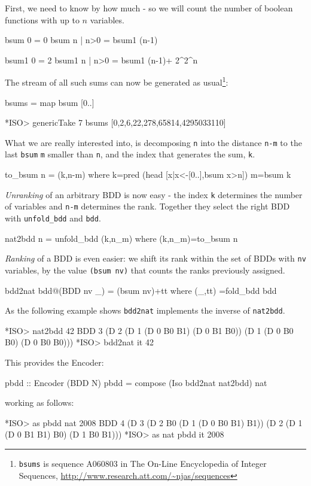 \documentclass[]{INCLUDES/llncs}
\begin{document}
First, we need to know by how much - so we will count the number
of boolean functions with up to $n$ variables.
\begin{code}
bsum 0 = 0
bsum n | n>0 = bsum1 (n-1)

bsum1 0 = 2
bsum1 n | n>0 = bsum1 (n-1)+ 2^2^n
\end{code}
The stream of all such sums can now be generated as usual\footnote{{\tt bsums}
is sequence A060803 in The On-Line Encyclopedia of Integer
Sequences, \url{http://www.research.att.com/~njas/sequences}}:
\begin{code}
bsums = map bsum [0..]
\end{code}
\begin{codex}
*ISO> genericTake 7 bsums
  [0,2,6,22,278,65814,4295033110]
\end{codex}

What we are really interested into, is decomposing {\tt n} into
the distance {\tt n-m} to the
last {\tt bsum} {\tt m} smaller than {\tt n},
and the index that generates the sum, {\tt k}.
\begin{code}
to_bsum n = (k,n-m) where 
  k=pred (head [x|x<-[0..],bsum x>n])
  m=bsum k
\end{code}
{\em Unranking} of an arbitrary BDD is now easy - the index {\tt k}
determines the number of variables and {\tt n-m} determines
the rank. Together they select the right BDD
with {\tt unfold\_bdd} and {\tt bdd}.
\begin{code}
nat2bdd n = unfold_bdd (k,n_m) where (k,n_m)=to_bsum n
\end{code}
{\em Ranking} of a BDD is even easier: we shift its rank
within the set of BDDs with {\tt nv} 
variables, by the value {\tt (bsum nv)} that
counts the ranks previously assigned.
\begin{code}
bdd2nat bdd@(BDD nv _) = (bsum nv)+tt where
  (_,tt) =fold_bdd bdd
\end{code}
As the following example shows
{\tt bdd2nat}
implements the inverse of
{\tt nat2bdd}.
\begin{codex}
*ISO> nat2bdd 42
BDD 3 (D 2 (D 1 (D 0 B0 B1) (D 0 B1 B0)) 
           (D 1 (D 0 B0 B0) (D 0 B0 B0)))
*ISO> bdd2nat it
42
\end{codex}

This provides the Encoder:
\begin{code}
pbdd :: Encoder (BDD N)
pbdd = compose (Iso bdd2nat nat2bdd) nat
\end{code}
working as follows:
\begin{codex}
*ISO> as pbdd nat 2008
BDD 4 (D 3 (D 2 B0 (D 1 (D 0 B0 B1) B1)) 
      (D 2 (D 1 (D 0 B1 B1) B0) (D 1 B0 B1)))
*ISO> as nat pbdd it
2008
\end{codex}
\end{document}
